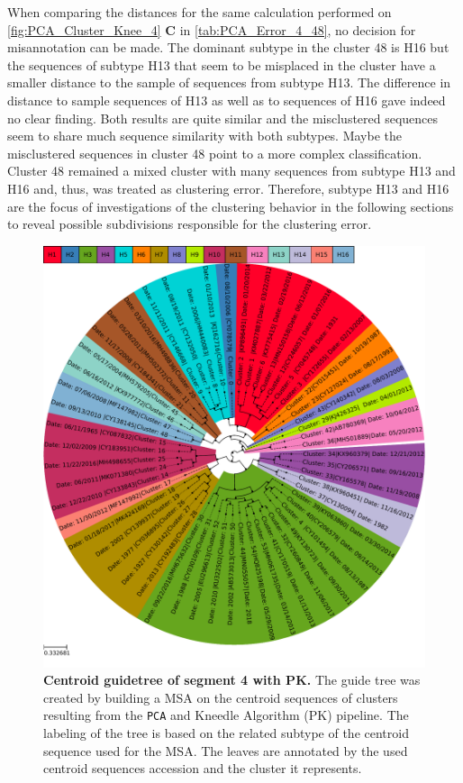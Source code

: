 \vspace{1em}

When comparing the distances for the same calculation performed on \autoref{fig:PCA_Cluster_Knee_4} \textbf{\textsf{C}} in \autoref{tab:PCA_Error_4_48}, no decision for misannotation can be made. The dominant subtype in the cluster 48 is H16 but the sequences of subtype H13 that seem to be misplaced in the cluster have a smaller distance to the sample of sequences from subtype H13. The difference in distance to sample sequences of H13 as well as to sequences of H16 gave indeed no clear finding. Both results are quite similar and the misclustered sequences seem to share much sequence similarity with both subtypes. Maybe the misclustered sequences in cluster 48 point to a more complex classification. Cluster 48 remained a mixed cluster with many sequences from subtype H13 and H16 and, thus, was treated as clustering error. Therefore, subtype H13 and H16 are the focus of investigations of the clustering behavior in the following sections to reveal possible subdivisions responsible for the clustering error.

\begin{figure}[!hbt]
    \centering
    \includegraphics[width=\textwidth]{PCA/Guidetree_segment_4_H_Centroid.pdf}
    \caption[Centroid guidetree of segment 4 with PK]{\textbf{Centroid guidetree of segment 4 with PK.} The guide tree was created by building a \gls{MSA} on the centroid sequences of clusters resulting from the \texttt{PCA} and Kneedle Algorithm (PK) pipeline. The labeling of the tree is based on the related subtype of the centroid sequence used for the \gls{MSA}. The leaves are annotated by the used centroid sequences accession and the cluster it represents.}
    \label{fig:PCA_Guidetree_Centroid_4}
\end{figure}

